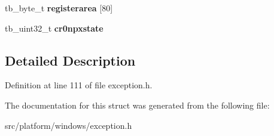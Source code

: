 \begin{DoxyCompactItemize}
\item 
\hypertarget{structtb__exception__context__float__t_a0984e53c0c5746abb13384a64b194b04}{tb\-\_\-byte\-\_\-t {\bfseries registerarea} \mbox{[}80\mbox{]}}\label{structtb__exception__context__float__t_a0984e53c0c5746abb13384a64b194b04}

\item 
\hypertarget{structtb__exception__context__float__t_a98fe8fe8de88003626868c81ccdcc2f9}{tb\-\_\-uint32\-\_\-t {\bfseries cr0npxstate}}\label{structtb__exception__context__float__t_a98fe8fe8de88003626868c81ccdcc2f9}

\end{DoxyCompactItemize}


\subsection{Detailed Description}


Definition at line 111 of file exception.\-h.



The documentation for this struct was generated from the following file\-:\begin{DoxyCompactItemize}
\item 
src/platform/windows/exception.\-h\end{DoxyCompactItemize}
